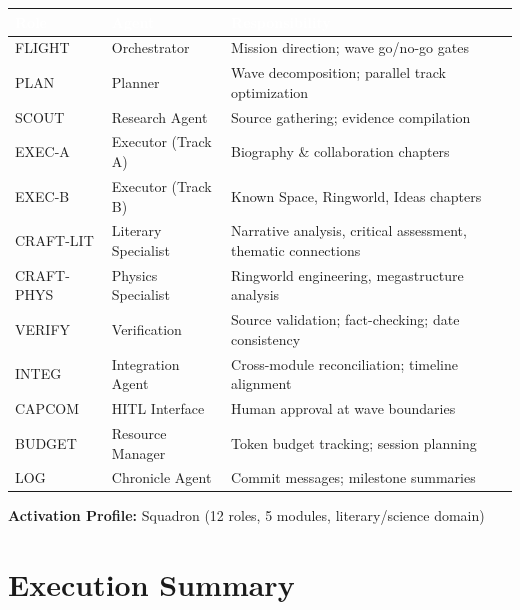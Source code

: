 \documentclass[11pt,letterpaper]{article}
\newcommand{\tableheader}[1]{\textbf{\sffamily\textcolor{white}{#1}}}
\begin{document}
\begin{center}
\begin{tabularx}{\textwidth}{L{2cm}L{2.5cm}X}
\toprule
{}
\tableheader{Role} & \tableheader{Agent} & \tableheader{Responsibility} \\
\midrule
FLIGHT & Orchestrator & Mission direction; wave go/no-go gates \\
PLAN & Planner & Wave decomposition; parallel track optimization \\
SCOUT & Research Agent & Source gathering; evidence compilation \\
EXEC-A & Executor (Track A) & Biography \& collaboration chapters \\
EXEC-B & Executor (Track B) & Known Space, Ringworld, Ideas chapters \\
CRAFT-LIT & Literary Specialist & Narrative analysis, critical assessment, thematic connections \\
CRAFT-PHYS & Physics Specialist & Ringworld engineering, megastructure analysis \\
VERIFY & Verification & Source validation; fact-checking; date consistency \\
INTEG & Integration Agent & Cross-module reconciliation; timeline alignment \\
CAPCOM & HITL Interface & Human approval at wave boundaries \\
BUDGET & Resource Manager & Token budget tracking; session planning \\
LOG & Chronicle Agent & Commit messages; milestone summaries \\
\bottomrule
\end{tabularx}
\end{center}

\textbf{Activation Profile:} Squadron (12 roles, 5 modules, literary/science domain)

\section{Execution Summary}
\end{document}
